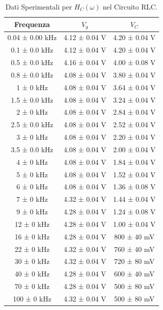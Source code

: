 \documentclass[a4paper]{article}
\begin{document}
\begin{table}[htbp]
\centering
\begin{tabular}{|c|c|c|}
\hline
Frequenza & $V_g$ & $V_C$ \\\hline\hline
0.04 ± 0.00 kHz & 4.12 ± 0.04 V & 4.20 ± 0.04 V \\
0.1 ± 0.0 kHz & 4.12 ± 0.04 V & 4.20 ± 0.04 V \\
0.5 ± 0.0 kHz & 4.16 ± 0.04 V & 4.00 ± 0.08 V \\
0.8 ± 0.0 kHz & 4.08 ± 0.04 V & 3.80 ± 0.04 V \\
1 ± 0 kHz & 4.08 ± 0.04 V & 3.64 ± 0.04 V \\
1.5 ± 0.0 kHz & 4.08 ± 0.04 V & 3.24 ± 0.04 V \\
2 ± 0 kHz & 4.08 ± 0.04 V & 2.84 ± 0.04 V \\
2.5 ± 0.0 kHz & 4.08 ± 0.04 V & 2.52 ± 0.04 V \\
3 ± 0 kHz & 4.08 ± 0.04 V & 2.20 ± 0.04 V \\
3.5 ± 0.0 kHz & 4.08 ± 0.04 V & 2.00 ± 0.04 V \\
4 ± 0 kHz & 4.08 ± 0.04 V & 1.84 ± 0.04 V \\
5 ± 0 kHz & 4.08 ± 0.04 V & 1.52 ± 0.04 V \\
6 ± 0 kHz & 4.08 ± 0.04 V & 1.36 ± 0.08 V \\
7 ± 0 kHz & 4.32 ± 0.04 V & 1.44 ± 0.04 V \\
9 ± 0 kHz & 4.28 ± 0.04 V & 1.24 ± 0.08 V \\
12 ± 0 kHz & 4.28 ± 0.04 V & 1.00 ± 0.04 V \\
16 ± 0 kHz & 4.28 ± 0.04 V & 800 ± 40 mV \\
22 ± 0 kHz & 4.32 ± 0.04 V & 760 ± 40 mV \\
30 ± 0 kHz & 4.32 ± 0.04 V & 720 ± 80 mV \\
40 ± 0 kHz & 4.28 ± 0.04 V & 600 ± 40 mV \\
70 ± 0 kHz & 4.28 ± 0.04 V & 500 ± 80 mV \\
100 ± 0 kHz & 4.32 ± 0.04 V & 500 ± 80 mV \\
\hline
\end{tabular}
\caption{Dati Sperimentali per $H_C(\omega)$ nel Circuito RLC.}
\label{tab:dati_rlc_hc}
\end{table}
\end{document}
